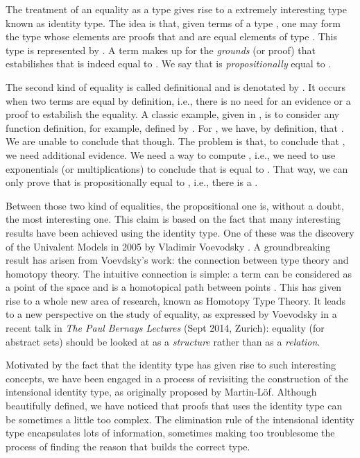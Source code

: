 \documentclass{entcs} \usepackage{entcsmacro}
\begin{document}
The treatment of an equality as a type gives rise to a extremely interesting type known as identity type. The idea is that, given terms  of a type , one may form the type whose elements are proofs that  and  are equal elements of type . This type is represented by . A term  makes up for the {\em grounds\/} \cite{Prawitz2009} (or proof) that estabilishes that  is indeed equal to . We say that  is {\em propositionally\/} equal to .

 The second kind of equality is called definitional and is denotated by . It occurs when two terms are equal by definition, i.e., there is no need for an evidence or a proof to estabilish the equality. A classic example, given in \cite{hott}, is to consider any function definition, for example,  defined by . For , we have, by definition, that . We are unable to conclude that  though. The problem is that, to conclude that , we need additional evidence. We need a way to compute , i.e., we need to use exponentials (or multiplications) to conclude that  is equal to . That way, we can only prove that  is propositionally equal to , i.e., there is a . 

Between those two kind of equalities, the propositional one is, without a doubt, the most interesting one. This claim is based on the fact that many interesting results have been achieved using the identity type. One of these was the discovery of the Univalent Models in 2005 by Vladimir Voevodsky \cite{Vlad1}. A groundbreaking result has arisen from Voevdsky's work: the connection between type theory and homotopy theory. The intuitive connection is simple: a term  can be considered as a point of the space  and  is a homotopical path between points  \cite{hott}. This has given rise to a whole new area of research, known as Homotopy Type Theory. It leads to a new perspective on the study of equality, as expressed by Voevodsky in a recent talk in {\em The Paul Bernays Lectures\/} (Sept 2014, Zurich): equality (for abstract sets) should be looked at as a {\em structure\/} rather than as a {\em relation\/}. 

Motivated by the fact that the identity type has given rise to such interesting concepts, we have been engaged in a process of revisiting the construction of the intensional identity type, as originally proposed by Martin-L\"of. Although beautifully defined, we have noticed that proofs that uses the identity type can be sometimes a little too complex. The elimination rule of the intensional identity type encapsulates lots of information, sometimes making too troublesome the process of finding the reason that builds the correct type.
\end{document}
